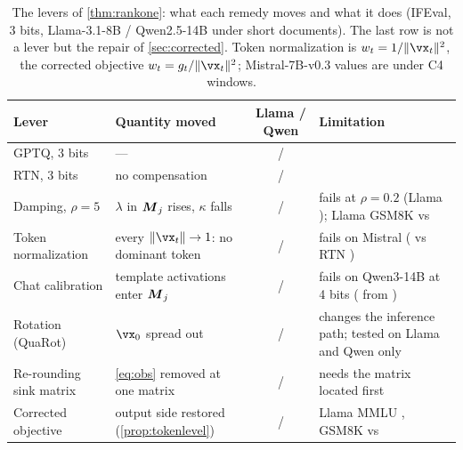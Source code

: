 \begin{table}[t]
\caption{The levers of \cref{thm:rankone}: what each remedy moves and what it
does (IFEval, 3 bits, Llama-3.1-8B / Qwen2.5-14B under short documents). The
last row is not a lever but the repair of \cref{sec:corrected}. Token
normalization is $\wtok=1/\|\vx_t\|^2$, the corrected objective
$\wtok=\gsens/\|\vx_t\|^2$; Mistral-7B-v0.3 values are under C4 windows.}
\label{tab:levers}
\footnotesize
\setlength{\tabcolsep}{4pt}

\begin{tabular}{l>{\raggedright\arraybackslash}p{3.2cm}c>{\raggedright\arraybackslash}p{4.3cm}}
\toprule
Lever & Quantity moved & Llama / Qwen & Limitation \\
\midrule
GPTQ, 3 bits & --- & \LgptqIF{} / \QgptqIF{} & \\
RTN, 3 bits & no compensation & \LrtnIF{} / \QrtnIF{} & \\
\midrule
Damping, $\rho=5$ & $\lambda$ in $\boldsymbol{M}_j$ rises, $\kappa$ falls & \LdampFiveIF{} / \QdampFiveIF{} & fails at $\rho=0.2$ (Llama \LdampPtTwoIF{}); Llama GSM8K \LdampFiveGSM{} vs \LzeroBitGSM{} \\
Token normalization & every $\|\vx_t\|\to1$: no dominant token & \LtnormIF{} / \QtnormIF{} & fails on Mistral (\MtnormIF{} vs RTN \MrtnIF{}) \\
Chat calibration & template activations enter $\boldsymbol{M}_j$ & \LcchatIF{} / \QcchatIF{} & fails on Qwen3-14B at 4 bits (\QthreeFourChatIF{} from \QthreeFourGptqIF{}) \\
Rotation (QuaRot) &  $\vx_0$ spread out & \LrotIF{} / \QrotIF{} & changes the inference path; tested on Llama and Qwen only \\
Re-rounding sink matrix & \cref{eq:obs} removed at one matrix & \LoneMatrixIF{} / \QoneMatrixIF{} & needs the matrix located first \\
\midrule
Corrected objective & output side restored (\cref{prop:tokenlevel}) & \LcorrIF{} / \QcorrIF{} & Llama MMLU \LcorrMMLU{}, GSM8K \LcorrGSM{} vs \LzeroBitGSM{} \\
\bottomrule
\end{tabular}
\end{table}
